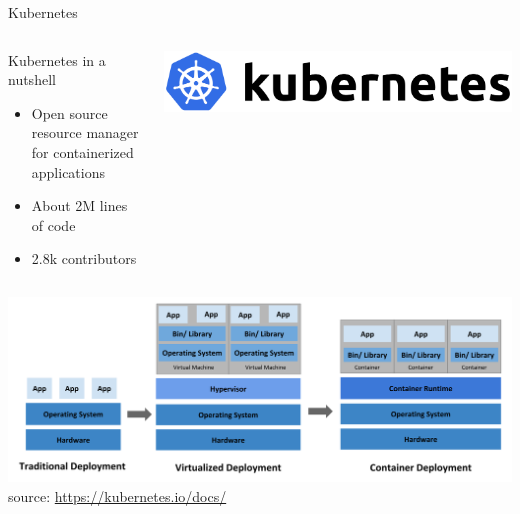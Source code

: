 \documentclass[12pt, aspectratio=43]{beamer}
\begin{document}
\begin{frame}{Kubernetes}
	\begin{columns}
		\begin{block}{Kubernetes in a nutshell}
			\begin{itemize}
				\item Open source resource manager for
					containerized applications
				\item About 2M lines of code
				\item 2.8k contributors
			\end{itemize}
		\end{block}

		\centering
		\includegraphics[width=\textwidth]{../imgs/kube-logo.png}
	\end{columns}

	\centering
	\includegraphics[width=\textwidth]{../imgs/container_evolution.png}
	\tiny{source: \url{https://kubernetes.io/docs/}}
\end{frame}
\end{document}
